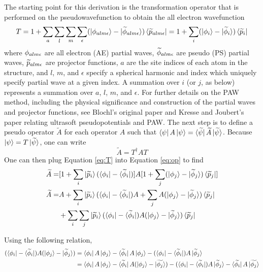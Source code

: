 \documentclass[12pt]{article}
\begin{document}
The starting point for this derivation is the transformation operator that
is performed on the pseudowavefunction to obtain the all electron wavefunction
\begin{equation}
T=1+\sum_a\sum_l\sum_m\sum_{\epsilon}(\ket{\phi_{alm\epsilon}}-\ket{\widetilde{\phi}_{alm\epsilon}})
\bra{\widetilde{p}_{alm\epsilon}}=1+\sum_i(\ket{\phi_i}-\ket{\widetilde{\phi}_i})
\bra{\widetilde{p}_i}
\label{eq:T}
\end{equation}
where $\phi_{alm\epsilon}$ are all electron (AE) partial waves, $\widetilde{\phi}_{alm\epsilon}$
are pseudo (PS) partial waves, $\widetilde{p}_{alm\epsilon}$ are projector functions,
$a$ are the site indices of each atom in the structure, and $l$, $m$, and $\epsilon$
specify a spherical harmonic and index which uniquely specify partial wave at a given
index. A summation over $i$ (or $j$, as below) represents a summation over $a$, $l$, $m$,
and $\epsilon$. For further details on the PAW method, including the physical significance
and construction of the partial waves and projector functions, see Blochl's original paper
and Kresse and Joubert's paper relating ultrasoft pseudopotentials and PAW.\cite{blochl,vasp4}
The next step is to define a pseudo operator $\widetilde{A}$ for each operator $A$
such that $\bra{\psi}A\ket{\psi}=\bra{\widetilde{\psi}}\widetilde{A}\ket{\widetilde{\psi}}$.
Because $\ket{\psi}=T\ket{\widetilde{\psi}}$, one can write
\begin{equation}
\widetilde{A}=T^{\dagger}AT
\label{eq:op}
\end{equation}
One can then plug Equation \ref{eq:T} into Equation \ref{eq:op} to find
\begin{equation}
\begin{split}
\widetilde{A} = & [1+\sum_i\ket{\widetilde{p}_i}(\bra{\phi_i}-\bra{\widetilde{\phi}_i})]
A[1+\sum_j(\ket{\phi_j}-\ket{\widetilde{\phi}_j})
\bra{\widetilde{p}_j}]\\
\widetilde{A} = & A+\sum_i\ket{\widetilde{p}_i}(\bra{\phi_i}-\bra{\widetilde{\phi}_i})A
+\sum_j A(\ket{\phi_j}-\ket{\widetilde{\phi}_j})\bra{\widetilde{p}_j}\\
& +\sum_i\sum_j\ket{\widetilde{p}_i}(\bra{\phi_i}-\bra{\widetilde{\phi}_i})A
(\ket{\phi_j}-\ket{\widetilde{\phi}_j})\bra{\widetilde{p}_j}
\end{split}
\label{eq:res}
\end{equation}

Using the following relation,
\begin{equation}
\begin{split}
(\bra{\phi_i}-\bra{\widetilde{\phi}_i})A(\ket{\phi_j}-\ket{\widetilde{\phi}_j})
& =\bra{\phi_i}A\ket{\phi_j}-\bra{\widetilde{\phi}_i}A\ket{\phi_j}
-(\bra{\phi_i}-\bra{\widetilde{\phi}_i})A\ket{\widetilde{\phi}_j}\\
& =\bra{\phi_i}A\ket{\phi_j}-\bra{\widetilde{\phi}_i}A(\ket{\phi_j}-\ket{\widetilde{\phi_j}})
-(\bra{\phi_i}-\bra{\widetilde{\phi}_i})A\ket{\widetilde{\phi}_j}
-\bra{\widetilde{\phi_i}}A\ket{\widetilde{\phi_j}}
\end{split}
\end{equation}
\end{document}
